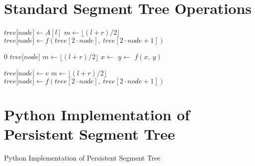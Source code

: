 \documentclass{fairmeta}
\numberwithin{equation}{section}
\begin{document}
\newpage
\appendix
\section{Standard Segment Tree Operations}

\begin{algorithm}[H]
    \caption{Segment Tree Build}
    \begin{algorithmic}[1]
        \State $\textit{tree[node]} \gets A[l]$
        \State \Return
        \EndIf
        \State $m \gets \lfloor (l + r) / 2 \rfloor$
        \State {}
        \State {}
        \State $\textit{tree[node]} \gets f(\textit{tree}[2 \cdot \textit{node}],\ \textit{tree}[2 \cdot \textit{node} + 1])$
        \EndFunction
    \end{algorithmic}
    \label{alg:build}
\end{algorithm}

\begin{algorithm}[H]
    \caption{Segment Tree Range Query}
    \begin{algorithmic}[1]
        \State \Return $0$ 
        \EndIf
        \State \Return $\textit{tree[node]}$ 
        \EndIf
        \State $m \gets \lfloor (l + r) / 2 \rfloor$
        \State $x \gets$ 
        \State $y \gets$ 
        \State \Return $f(x,\ y)$
        \EndFunction
    \end{algorithmic}
    \label{alg:query}
\end{algorithm}

\begin{algorithm}[H]
    \caption{Segment Tree Point Update}
    \begin{algorithmic}[1]
        \State $\textit{tree[node]} \gets v$
        \State \Return
        \EndIf
        \State $m \gets \lfloor (l + r) / 2 \rfloor$
        \State {}
        \Else
        \State {}
        \EndIf
        \State $\textit{tree[node]} \gets f(\textit{tree}[2 \cdot \textit{node}],\ \textit{tree}[2 \cdot \textit{node} + 1])$
        \EndFunction
    \end{algorithmic}
    \label{alg:update}
\end{algorithm}

\nopagebreak

\section{Python Implementation of Persistent Segment Tree}\label{section:python_implementation}
\begin{pbox}[label={ex:fm_standalone}]{Python Implementation of Persistent Segment Tree}
    \inputminted{python}{assets/pst.py}
\end{pbox}

\appendix
\end{document}
